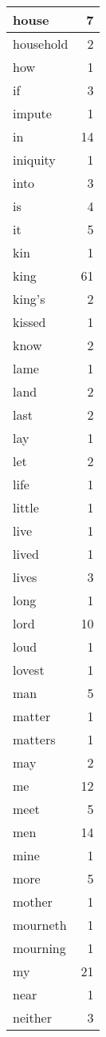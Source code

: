\begin{center}
\begin{longtable}{l|r}
house & 7 \\ \hline
household & 2 \\ \hline
how & 1 \\ \hline
if & 3 \\ \hline
impute & 1 \\ \hline
in & 14 \\ \hline
iniquity & 1 \\ \hline
into & 3 \\ \hline
is & 4 \\ \hline
it & 5 \\ \hline
kin & 1 \\ \hline
king & 61 \\ \hline
king's & 2 \\ \hline
kissed & 1 \\ \hline
know & 2 \\ \hline
lame & 1 \\ \hline
land & 2 \\ \hline
last & 2 \\ \hline
lay & 1 \\ \hline
let & 2 \\ \hline
life & 1 \\ \hline
little & 1 \\ \hline
live & 1 \\ \hline
lived & 1 \\ \hline
lives & 3 \\ \hline
long & 1 \\ \hline
lord & 10 \\ \hline
loud & 1 \\ \hline
lovest & 1 \\ \hline
man & 5 \\ \hline
matter & 1 \\ \hline
matters & 1 \\ \hline
may & 2 \\ \hline
me & 12 \\ \hline
meet & 5 \\ \hline
men & 14 \\ \hline
mine & 1 \\ \hline
more & 5 \\ \hline
mother & 1 \\ \hline
mourneth & 1 \\ \hline
mourning & 1 \\ \hline
my & 21 \\ \hline
near & 1 \\ \hline
neither & 3 \\ \hline

\end{longtable}
\end{center}
